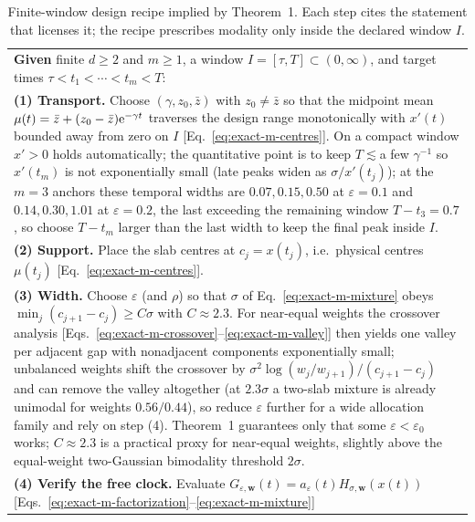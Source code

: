 \begin{table}[!t]
\caption{Finite-window design recipe implied by Theorem~1.  Each step
cites the statement that licenses it; the recipe prescribes modality only
inside the declared window $I$.
\label{tab:design-recipe}}
\begin{ruledtabular}
\begin{tabular}{p{}}
\textbf{Given} finite $d\ge2$ and $m\ge1$, a window
$I=[\tau,T]\subset(0,\infty)$, and target times
$\tau<t_1<\cdots<t_m<T$:\\[3pt]
\textbf{(1) Transport.}  Choose $(\gamma,z_0,\bar z)$ with
$z_0\ne\bar z$ so that the midpoint mean
$\mu(t)=\bar z+(z_0-\bar z)\mathrm e^{-\gamma t}$ traverses the design range
monotonically with $x'(t)$ bounded away from zero on $I$
[Eq.~\eqref{eq:exact-m-centres}].  On a compact window $x'>0$ holds
automatically; the quantitative point is to keep
$T\lesssim{}$a few $\gamma^{-1}$ so $x'(t_m)$ is not exponentially
small (late peaks widen as $\sigma/x'(t_j)$); at the $m=3$ anchors these
temporal widths are $0.07,0.15,0.50$ at $\varepsilon=0.1$ and
$0.14,0.30,1.01$ at $\varepsilon=0.2$, the last exceeding the remaining
window $T-t_3=0.7$, so choose $T-t_m$ larger than the last width to keep the
final peak inside $I$.\\[3pt]
\textbf{(2) Support.}  Place the slab centres at $c_j=x(t_j)$,
i.e.\ physical centres $\mu(t_j)$
[Eq.~\eqref{eq:exact-m-centres}].\\[3pt]
\textbf{(3) Width.}  Choose $\varepsilon$ (and $\rho$) so that
$\sigma$ of Eq.~\eqref{eq:exact-m-mixture} obeys
$\min_j(c_{j+1}-c_j)\ge C\sigma$ with $C\approx2.3$.  For near-equal
weights the crossover analysis
[Eqs.~\eqref{eq:exact-m-crossover}--\eqref{eq:exact-m-valley}] then yields
one valley per adjacent gap with nonadjacent components exponentially
small; unbalanced weights shift the crossover by
$\sigma^2\log(w_j/w_{j+1})/(c_{j+1}-c_j)$ and can remove the valley
altogether (at $2.3\sigma$ a two-slab mixture is already unimodal for
weights $0.56/0.44$), so reduce $\varepsilon$ further for a wide
allocation family and rely on step (4).
Theorem~1 guarantees only that some $\varepsilon<\varepsilon_0$ works;
$C\approx2.3$ is a practical proxy for near-equal weights, slightly above the equal-weight
two-Gaussian bimodality threshold $2\sigma$.\\[3pt]
\textbf{(4) Verify the free clock.}  Evaluate
$G_{\varepsilon,\bm w}(t)=a_\varepsilon(t)H_{\sigma,\bm w}(x(t))$
[Eqs.~\eqref{eq:exact-m-factorization}--\eqref{eq:exact-m-mixture}]

\end{tabular}
\end{ruledtabular}
\end{table}
